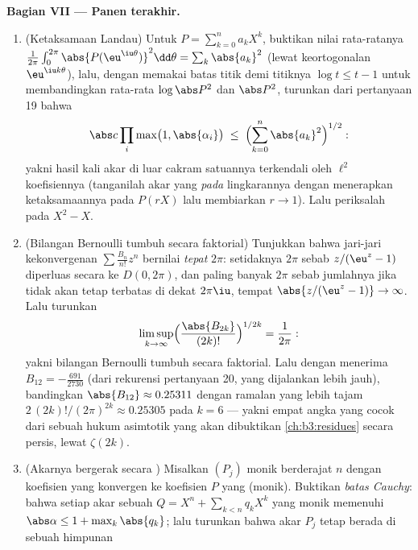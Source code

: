 \begin{problem}
\medskip
\noindent\textbf{Bagian VII --- Panen terakhir.}
\begin{enumerate}[resume]
  \item (Ketaksamaan Landau) Untuk $P = \sum_{k=0}^na_kX^k$,
        buktikan nilai rata-ratanya $\frac1{2\pi}\int_0^{2\pi}
        \abs{P(\eu^{\iu\theta})}^2\dd\theta =
        \sum_k\abs{a_k}^2$ (lewat keortogonalan
        $\eu^{\iu k\theta}$), lalu, dengan memakai batas titik demi titiknya
        $\log t \leq t - 1$ untuk membandingkan rata-rata
        $\log\abs P^2$ dan $\abs P^2$, turunkan dari pertanyaan
        19 bahwa
        \[
        \abs c\prod_{i}\max\bigl(1, \abs{\alpha_i}\bigr)
        \;\leq\;
        \Bigl(\sum_{k=0}^{n}\abs{a_k}^2\Bigr)^{1/2} :
        \]
        yakni hasil kali akar di luar cakram satuannya
        terkendali oleh  $\ell^2$ koefisiennya
        (tanganilah akar yang \emph{pada} lingkarannya dengan menerapkan
        ketaksamaannya pada $P(rX)$ lalu membiarkan $r \to 1$). Lalu periksalah
        pada $X^2 - X$.
  \item (Bilangan Bernoulli tumbuh secara faktorial) Tunjukkan bahwa
        jari-jari kekonvergenan $\sum\frac{B_n}{n!}z^n$ bernilai
        \emph{tepat} $2\pi$: setidaknya $2\pi$ sebab
        $z/(\eu^z - 1)$ diperluas secara  ke
        $D(0, 2\pi)$, dan paling banyak $2\pi$ sebab jumlahnya jika tidak
        akan tetap terbatas di dekat $2\pi\iu$, tempat
        $\abs{z/(\eu^z-1)} \to \infty$. Lalu turunkan
        \[
        \limsup_{k\to\infty}
        \Bigl(\frac{\abs{B_{2k}}}{(2k)!}\Bigr)^{1/2k}
        = \frac1{2\pi} :
        \]
        yakni bilangan Bernoulli tumbuh secara faktorial. Lalu dengan menerima $B_{12}
        = -\frac{691}{2730}$ (dari rekurensi pertanyaan 20,
        yang dijalankan lebih jauh), bandingkan $\abs{B_{12}} \approx 0.25311$
        dengan ramalan yang lebih tajam $2\,(2k)!/(2\pi)^{2k}
        \approx 0.25305$ pada $k = 6$ --- yakni empat angka yang cocok
        dari sebuah hukum asimtotik yang akan dibuktikan
        \cref{ch:b3:residues} secara persis, lewat $\zeta(2k)$.
  \item (Akarnya bergerak secara ) Misalkan $(P_j)$ monik
        berderajat $n$ dengan koefisien yang konvergen ke koefisien
        $P$ yang (monik). Buktikan \emph{batas Cauchy}: bahwa setiap
        akar sebuah $Q = X^n + \sum_{k<n}q_kX^k$ yang monik
        memenuhi $\abs\alpha \leq 1 + \max_k\abs{q_k}$;
        lalu turunkan bahwa akar $P_j$ tetap berada di sebuah himpunan

\end{enumerate}
\end{problem}
